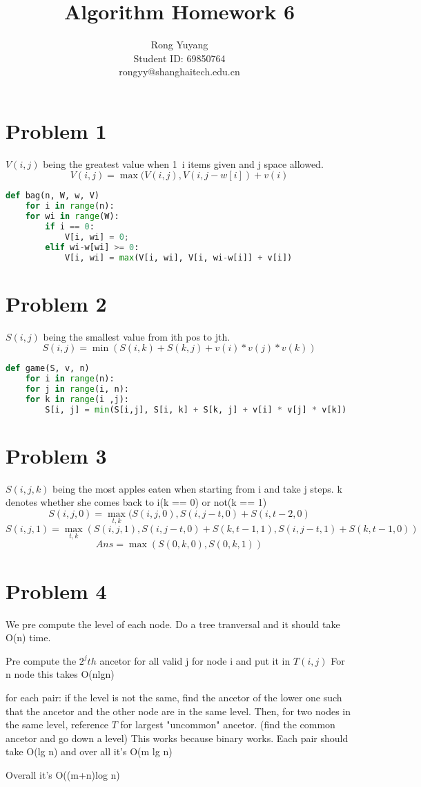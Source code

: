 \documentclass{article}
\title{Algorithm Homework 6}
\author{Rong Yuyang \\ Student ID: 69850764 \\ rongyy@shanghaitech.edu.cn}
\begin{document}
\maketitle

\section*{Problem 1}
$V(i, j)$ being the greatest value when 1~i items given and j space allowed.
$$V(i, j) = \max(V(i, j), V(i, j-w[i]) + v(i)$$
\begin{lstlisting}[language = python]
def bag(n, W, w, V)
	for i in range(n):
	for wi in range(W):
		if i == 0:
			V[i, wi] = 0;
		elif wi-w[wi] >= 0:
			V[i, wi] = max(V[i, wi], V[i, wi-w[i]] + v[i])
\end{lstlisting}
\section*{Problem 2}
$S(i, j)$ being the smallest value from ith pos to jth.
$$S(i, j) = \min(S(i, k) + S(k, j) + v(i) * v(j) * v(k))$$
\begin{lstlisting}[language = python]
def game(S, v, n)
	for i in range(n):
	for j in range(i, n):
	for k in range(i ,j):
		S[i, j] = min(S[i,j], S[i, k] + S[k, j] + v[i] * v[j] * v[k])
\end{lstlisting}
\section*{Problem 3}
$S(i, j, k)$ being the most apples eaten when starting from i and take j steps. k denotes whether she comes back to i(k == 0) or not(k == 1)
$$S(i, j, 0) = \max_{t, k}(S(i, j, 0), S(i, j-t, 0) + S(i, t-2, 0)$$
$$S(i, j, 1) = \max_{t, k}(S(i, j, 1), S(i, j-t, 0) + S(k, t-1, 1), S(i, j-t, 1) + S(k, t-1, 0))$$
$$Ans = \max(S(0, k, 0), S(0, k, 1))$$
\section*{Problem 4}
\par We pre compute the level of each node. Do a tree tranversal and it should take O(n) time.
\par Pre compute the $2^jth$ ancetor for all valid j for node i and put it in $T(i, j)$ For n node this takes O(nlgn)
\par for each pair: if the level is not the same, find the ancetor of the lower one such that the ancetor and the other node are in the same level. Then, for two nodes in the same level, reference $T$ for largest "uncommon" ancetor. (find the common ancetor and go down a level) This works because binary works. Each pair should take O(lg n) and over all it's O(m lg n)
\par Overall it's O((m+n)log n)
\end{document}
